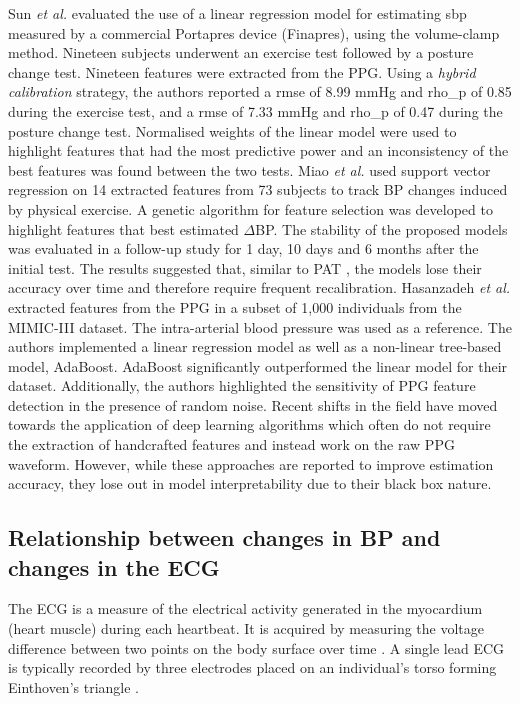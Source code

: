 \documentclass[fleqn,10pt]{wlscirep}
\begin{document}
Sun \textit{et al.} \cite{Sun2016} evaluated the use of a linear regression model for estimating \ac{sbp} measured by a commercial Portapres device (Finapres), using the volume-clamp method. Nineteen subjects underwent an exercise test followed by a posture change test. Nineteen features were extracted from the PPG. Using a \textit{hybrid calibration} strategy, the authors reported a \ac{rmse} of 8.99 mmHg and \ac{rho_p} of 0.85 during the exercise test, and a \ac{rmse} of 7.33 mmHg and \ac{rho_p} of 0.47 during the posture change test. Normalised weights of the linear model were used to highlight features that had the most predictive power and an inconsistency of the best features was found between the two tests. Miao \textit{et al.} \cite{Miao2017} used support vector regression on 14 extracted features from 73 subjects to track BP changes induced by physical exercise. A genetic algorithm for feature selection was developed to highlight features that best estimated $\Delta$BP. The stability of the proposed models was evaluated in a follow-up study for 1 day, 10 days and 6 months after the initial test. The results suggested that, similar to PAT \cite{Wong2009,Mukkamala2018}, the models lose their accuracy over time and therefore require frequent recalibration. Hasanzadeh \textit{et al.} \cite{Hasanzadeh2019} extracted features from the PPG in a subset of 1,000 individuals from the MIMIC-III dataset. The intra-arterial blood pressure was used as a reference. The authors implemented a linear regression model as well as a non-linear tree-based model, AdaBoost. AdaBoost significantly outperformed the linear model for their dataset. Additionally, the authors highlighted the sensitivity of PPG feature detection in the presence of random noise. Recent shifts in the field have moved towards the application of deep learning algorithms\cite{Slapnicar2019, Schlesinger2020} which often do not require the extraction of handcrafted features and instead work on the raw PPG waveform. However, while these approaches are reported to improve estimation accuracy, they lose out in model interpretability due to their black box nature.


\subsection{Relationship between changes in BP and changes in the ECG}

The ECG is a measure of the electrical activity generated in the myocardium (heart muscle) during each heartbeat. It is acquired by measuring the voltage difference between two points on the body surface over time \cite{Reisner2006}. A single lead ECG is typically recorded by three electrodes placed on an individual's torso forming Einthoven's triangle \cite{Reisner2006}.  
\end{document}
